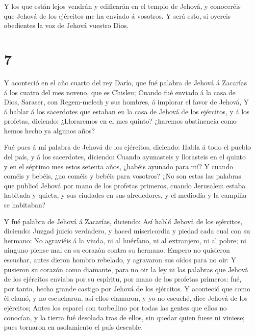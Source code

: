  Y los que están lejos vendrán y edificarán en el templo de
Jehová, y conoceréis que Jehová de los ejércitos me ha enviado á
vosotros. Y será esto, si oyereis obedientes la voz de Jehová vuestro
Dios.

\hypertarget{section-6}{%
\section{7}\label{section-6}}

 Y aconteció en el año cuarto del rey Darío, que fué palabra
de Jehová á Zacarías á los cuatro del mes noveno, que es Chisleu;
 Cuando fué enviado á la casa de Dios, Saraser, con
Regem-melech y sus hombres, á implorar el favor de Jehová, 
Y á hablar á los sacerdotes que estaban en la casa de Jehová de los
ejércitos, y á los profetas, diciendo: ¿Lloraremos en el mes quinto?
¿haremos abstinencia como hemos hecho ya algunos años?

 Fué pues á mí palabra de Jehová de los ejércitos, diciendo:
 Habla á todo el pueblo del país, y á los sacerdotes,
diciendo: Cuando ayunasteis y llorasteis en el quinto y en el séptimo
mes estos setenta años, ¿habéis ayunado para mí?  Y cuando
coméis y bebéis, ¿no coméis y bebéis para vosotros?  ¿No son
estas las palabras que publicó Jehová por mano de los profetas primeros,
cuando Jerusalem estaba habitada y quieta, y sus ciudades en sus
alrededores, y el mediodía y la campiña se habitaban?

 Y fué palabra de Jehová á Zacarías, diciendo: 
Así habló Jehová de los ejércitos, diciendo: Juzgad juicio verdadero, y
haced misericordia y piedad cada cual con su hermano:  No
agraviéis á la viuda, ni al huérfano, ni al extranjero, ni al pobre; ni
ninguno piense mal en su corazón contra su hermano.  Empero
no quisieron escuchar, antes dieron hombro rebelado, y agravaron sus
oídos para no oir:  Y pusieron su corazón como diamante,
para no oir la ley ni las palabras que Jehová de los ejércitos enviaba
por su espíritu, por mano de los profetas primeros: fué, por tanto,
hecho grande castigo por Jehová de los ejércitos.  Y
aconteció que como él clamó, y no escucharon, así ellos clamaron, y yo
no escuché, dice Jehová de los ejércitos;  Antes los
esparcí con torbellino por todas las gentes que ellos no conocían, y la
tierra fué desolada tras de ellos, sin quedar quien fuese ni viniese;
pues tornaron en asolamiento el país deseable.

